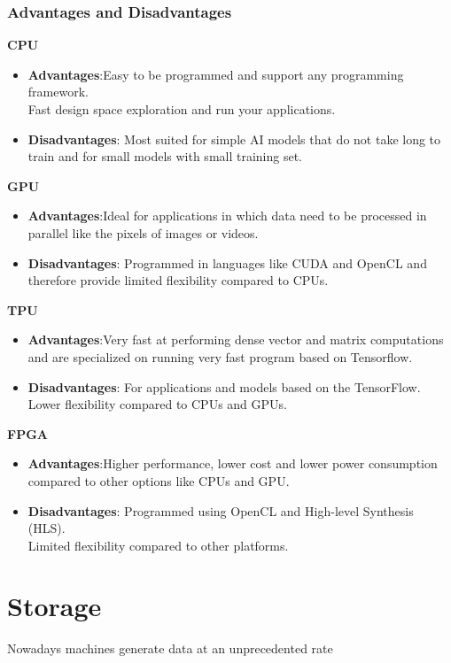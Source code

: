 \documentclass[10pt, oneside]{article}
\begin{document}
\subsubsection{Advantages and Disadvantages}
\textbf{CPU}
\begin{itemize}
    \item {\bf Advantages}:Easy to be programmed and support any programming framework.\\ Fast design space exploration
    and run your applications.
    \item {\bf Disadvantages}: Most suited for simple AI models that do not take long to train and for small models with small training set.
\end{itemize}
\textbf{GPU}
\begin{itemize}
    \item {\bf Advantages}:Ideal for applications in which data need to be processed in parallel like the pixels of images or videos.
    \item {\bf Disadvantages}: Programmed in languages like CUDA and OpenCL and therefore provide limited flexibility compared to CPUs.
\end{itemize}
\textbf{TPU}
\begin{itemize}
    \item {\bf Advantages}:Very fast at performing dense vector and matrix computations and are specialized on running very fast program based on Tensorflow.
    \item {\bf Disadvantages}: For applications and models based on the TensorFlow. Lower flexibility compared to CPUs and GPUs.
\end{itemize}
\textbf{FPGA}
\begin{itemize}
    \item {\bf Advantages}:Higher performance, lower cost and lower power consumption compared to other options like CPUs and GPU.
    \item {\bf Disadvantages}: Programmed using OpenCL and High-level Synthesis (HLS).\\Limited flexibility compared to
    other platforms.
\end{itemize}
\newpage

\section{Storage}
Nowadays machines generate data at an unprecedented rate 
\end{document}
